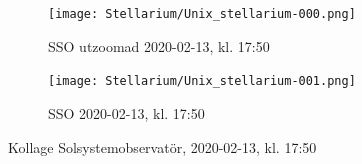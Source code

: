 \documentclass[./exercises.tex]{subfiles}
\begin{document}
\begin{itemize}
\begin{figure}[H]
     \centering
     \begin{subfigure}[b]{0.45\textwidth}
         \centering
         \texttt{[image: Stellarium/Unix\_stellarium-000.png]}
         \caption{SSO utzoomad 2020-02-13, kl. 17:50}
         \label{fig:y equals x}
     \end{subfigure}
     \hfill
     \begin{subfigure}[b]{0.45\textwidth}
         \centering
         \texttt{[image: Stellarium/Unix\_stellarium-001.png]}
         \caption{SSO 2020-02-13, kl. 17:50}
         \label{fig:three sin x}
     \end{subfigure}
     \hfill
        \caption{Kollage Solsystemobservatör, 2020-02-13, kl. 17:50 }
        \label{fig:perod graphs}
\end{figure}




\end{itemize}
\end{document}
